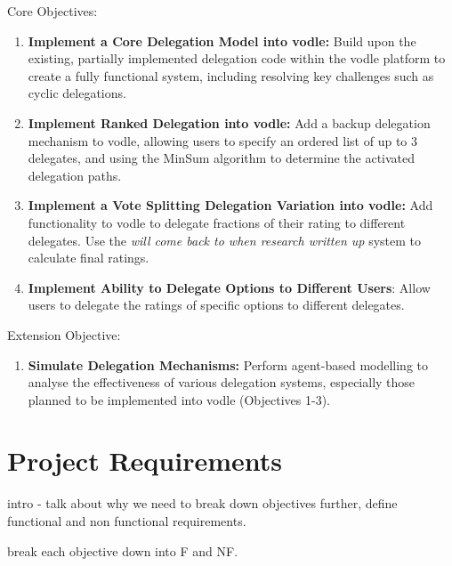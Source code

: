 Core Objectives:
\begin{enumerate}
    \item \textbf{Implement a Core Delegation Model into vodle: } Build upon the existing, partially implemented delegation code within the vodle platform to create a fully functional system, including resolving key challenges such as cyclic delegations.

    \item \textbf{Implement Ranked Delegation into vodle: } Add a backup delegation mechanism to vodle, allowing users to specify an ordered list of up to 3 delegates, and using the MinSum algorithm to determine the activated delegation paths.

    \item \textbf{Implement a Vote Splitting Delegation Variation into vodle: } Add functionality to vodle to delegate fractions of their rating to different delegates. Use the \textit{will come back to when research written up} system to calculate final ratings.

    \item \textbf{Implement Ability to Delegate Options to Different Users}: Allow users to delegate the ratings of specific options to different delegates.
\end{enumerate}

Extension Objective:
\begin{enumerate}
    \item \textbf{Simulate Delegation Mechanisms: } Perform agent-based modelling to analyse the effectiveness of various delegation systems, especially those planned to be implemented into vodle (Objectives 1-3).
\end{enumerate}

\section{Project Requirements}
intro - talk about why we need to break down objectives further, define functional and non functional requirements.

break each objective down into F and NF.